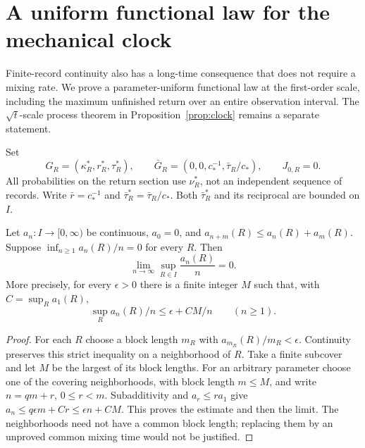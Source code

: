 \section{A uniform functional law for the mechanical clock}
\label{sec:uniform-fluid-clock}
Finite-record continuity also has a long-time consequence that does not
require a mixing rate. We prove a parameter-uniform functional law at the
first-order scale, including the maximum unfinished return over an entire
observation interval. The \(\sqrt t\)-scale process theorem in
Proposition~\ref{prop:clock} remains a separate statement.

Set
\[
 G_R=(\kappa_R^*,r_R^*,\tau_R^*),\qquad
 \bar G_R=(0,0,c_*^{-1},\bar\tau_R/c_*),\qquad J_{0,R}=0.
\]
All probabilities on the return section use $\nu_R^*$, not an
independent sequence of records. Write $\bar r=c_*^{-1}$ and
$\bar\tau_R^*=\bar\tau_R/c_*$. Both $\bar\tau_R^*$ and its reciprocal
are bounded on $I$.

\begin{lemma}
\label{lem:compact-subadditive}
Let $a_n:I\to[0,\infty)$ be continuous, $a_0=0$, and
$a_{n+m}(R)\le a_n(R)+a_m(R)$. Suppose
$\inf_{n\ge1}a_n(R)/n=0$ for every $R$. Then
\[
 \lim_{n\to\infty}\sup_{R\in I}\frac{a_n(R)}n=0.
\]
More precisely, for every $\epsilon>0$ there is a finite integer $M$
such that, with $C=\sup_R a_1(R)$,
\begin{equation}\label{eq:subadditive-uniform-budget}
 \sup_R a_n(R)/n\le\epsilon+CM/n\qquad(n\ge1).
\end{equation}
\end{lemma}
\begin{proof}
For each $R$ choose a block length $m_R$ with
$a_{m_R}(R)/m_R<\epsilon$. Continuity preserves this strict inequality
on a neighborhood of $R$. Take a finite subcover and let $M$ be the
largest of its block lengths. For an arbitrary parameter choose one of
the covering neighborhoods, with block length $m\le M$, and write
$n=qm+r$, $0\le r<m$. Subadditivity and $a_r\le r a_1$ give
$a_n\le q\epsilon m+Cr\le\epsilon n+CM$. This proves the
estimate and then the limit. The neighborhoods need not have a common
block length; replacing them by an unproved common mixing time would
not be justified.
\end{proof}

